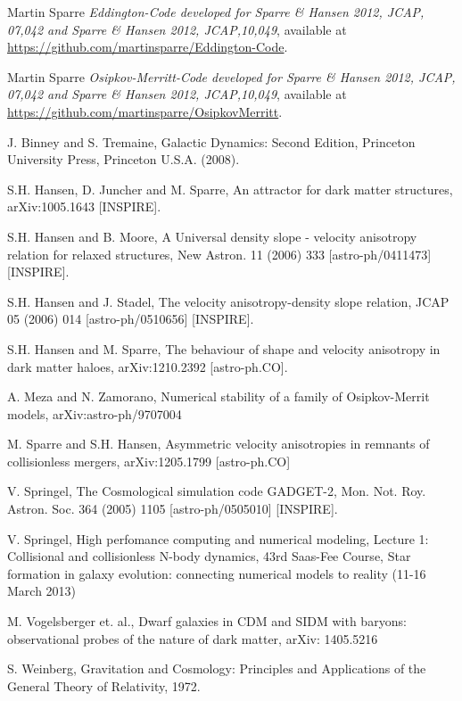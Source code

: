 \begin{thebibliography}{99}

\bibitem{}  Martin Sparre \emph{Eddington-Code developed for Sparre \& Hansen 2012, JCAP, 07,042 and Sparre \& Hansen 2012, JCAP,10,049},  available at \\
\url{https://github.com/martinsparre/Eddington-Code}.

\bibitem{}  Martin Sparre \emph{Osipkov-Merritt-Code developed for Sparre \& Hansen 2012, JCAP, 07,042 and Sparre \& Hansen 2012, JCAP,10,049},  available at \\
\url{https://github.com/martinsparre/OsipkovMerritt}.

\bibitem{} J. Binney and S. Tremaine, Galactic Dynamics: Second Edition, Princeton University Press, Princeton U.S.A. (2008).

\bibitem{} S.H. Hansen, D. Juncher and M. Sparre, An attractor for dark matter structures, arXiv:1005.1643 [INSPIRE].

\bibitem{} S.H. Hansen and B. Moore, A Universal density slope - velocity anisotropy relation for relaxed structures, New Astron. 11 (2006) 333 [astro-ph/0411473] [INSPIRE].

\bibitem{} S.H. Hansen and J. Stadel, The velocity anisotropy-density slope relation, JCAP 05 (2006) 014 [astro-ph/0510656] [INSPIRE].

\bibitem{} S.H. Hansen and M. Sparre, The behaviour of shape and velocity anisotropy in dark matter haloes, arXiv:1210.2392 [astro-ph.CO].

\bibitem{} A. Meza and N. Zamorano, Numerical stability of a family of Osipkov-Merrit models, arXiv:astro-ph/9707004

\bibitem{} M. Sparre and S.H. Hansen, Asymmetric velocity anisotropies in remnants of collisionless mergers, arXiv:1205.1799 [astro-ph.CO]

\bibitem{} V. Springel, The Cosmological simulation code GADGET-2, Mon. Not. Roy. Astron. Soc. 364 (2005) 1105 [astro-ph/0505010] [INSPIRE].

\bibitem{} V. Springel, High perfomance computing and numerical modeling, Lecture 1:
Collisional and collisionless N-body dynamics, 43rd Saas-Fee Course, Star formation in galaxy evolution: connecting numerical models to reality (11-16 March 2013)

\bibitem{} M. Vogelsberger et. al., Dwarf galaxies in CDM and SIDM with baryons: observational probes of the nature of dark matter, arXiv: 1405.5216

\bibitem{} S. Weinberg, Gravitation and Cosmology: Principles and Applications of the General Theory of Relativity, 1972.


\end{thebibliography}
